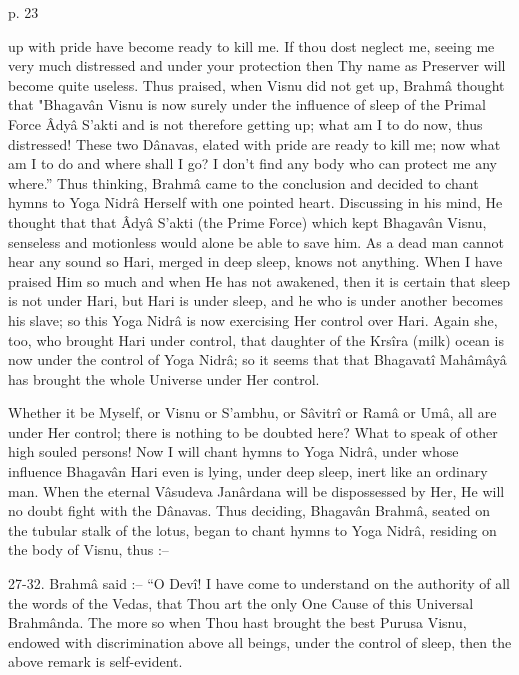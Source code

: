 p. 23

 

up with pride have become ready to kill me. If thou dost neglect me, seeing me very much distressed and under your protection then Thy name as Preserver will become quite useless. Thus praised, when Visnu did not get up, Brahmâ thought that "Bhagavân Visnu is now surely under the influence of sleep of the Primal Force Âdyâ S’akti and is not therefore getting up; what am I to do now, thus distressed! These two Dânavas, elated with pride are ready to kill me; now what am I to do and where shall I go? I don't find any body who can protect me any where.” Thus thinking, Brahmâ came to the conclusion and decided to chant hymns to Yoga Nidrâ Herself with one pointed heart. Discussing in his mind, He thought that that Âdyâ S’akti (the Prime Force) which kept Bhagavân Visnu, senseless and motionless would alone be able to save him. As a dead man cannot hear any sound so Hari, merged in deep sleep, knows not anything. When I have praised Him so much and when He has not awakened, then it is certain that sleep is not under Hari, but Hari is under sleep, and he who is under another becomes his slave; so this Yoga Nidrâ is now exercising Her control over Hari. Again she, too, who brought Hari under control, that daughter of the Krsîra (milk) ocean is now under the control of Yoga Nidrâ; so it seems that that Bhagavatî Mahâmâyâ has brought the whole Universe under Her control.

 

Whether it be Myself, or Visnu or S’ambhu, or Sâvitrî or Ramâ or Umâ, all are under Her control; there is nothing to be doubted here? What to speak of other high souled persons! Now I will chant hymns to Yoga Nidrâ, under whose influence Bhagavân Hari even is lying, under deep sleep, inert like an ordinary man. When the eternal Vâsudeva Janârdana will be dispossessed by Her, He will no doubt fight with the Dânavas. Thus deciding, Bhagavân Brahmâ, seated on the tubular stalk of the lotus, began to chant hymns to Yoga Nidrâ, residing on the body of Visnu, thus :--

 

27-32. Brahmâ said :-- “O Devî! I have come to understand on the authority of all the words of the Vedas, that Thou art the only One Cause of this Universal Brahmânda. The more so when Thou hast brought the best Purusa Visnu, endowed with discrimination above all beings, under the control of sleep, then the above remark is self-evident.

 

